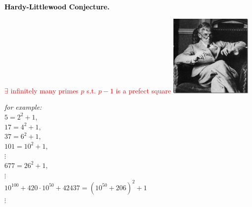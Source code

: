 \documentclass[landscape,display]{powersem} %
\newcommand{\heading}[1]{%
 \begin{center}
  \large\bf
  \shadowbox{{\textcolor{conceptcolor}{#1}}}%
 \end{center}
 \vspace{1ex minus 1ex}}
\begin{document}
\begin{slide}
\heading{Some conjectures regarding prime numbers: 3/5 }\pause

\textcolor{black}{\textbf{Hardy-Littlewood Conjecture.}} \pause

\textcolor{red}{$\exists$ infinitely many primes $p$ s.t. $p-1$ is a prefect square}\pause
 \includegraphics[width=4cm]{images/hardy.jpg}\pause

\vspace{-3.5cm}
\hspace*{5cm}
\begin{minipage}{7cm}
\textit{for example:} \\
$5=2^2+1$,\\ $17=4^2+1,$\\ $37=6^2+1$,\\ $101=10^2+1$,\\ $\vdots$\\ $677=26^2+1,$\\ $\vdots$\\
$10^{100}+420\cdot10^{50}+42437=(10^{50}+206)^2+1$\\$\vdots$\end{minipage}
\end{slide}
\end{document}

